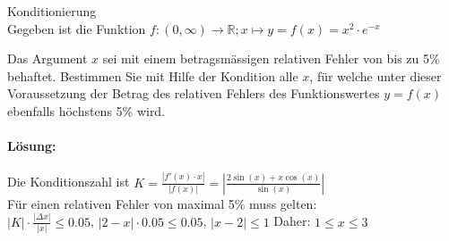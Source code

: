 \begin{example2}{Konditionierung}\\
Gegeben ist die Funktion
$f: (0,\infty) \rightarrow \mathbb{R}; x \mapsto y = f(x) = x^2 \cdot e^{-x}$

Das Argument $x$ sei mit einem betragsmässigen relativen Fehler von bis zu 5\% behaftet. Bestimmen Sie mit Hilfe der Kondition alle $x$, für welche unter dieser Voraussetzung der Betrag des relativen Fehlers des Funktionswertes $y = f(x)$ ebenfalls höchstens 5\% wird.
\paragraph{Lösung:}
Die Konditionszahl ist $K = \frac{|f'(x)\cdot x|}{|f(x)|} = \left|\frac{2\sin(x) + x\cos(x)}{\sin(x)}\right|$\\

Für einen relativen Fehler von maximal 5\% muss gelten:\\
$|K| \cdot \frac{|\Delta x|}{|x|} \leq 0.05$,
$|2-x| \cdot 0.05 \leq 0.05$,
$|x-2| \leq 1$
Daher: $1 \leq x \leq 3$
\end{example2}

